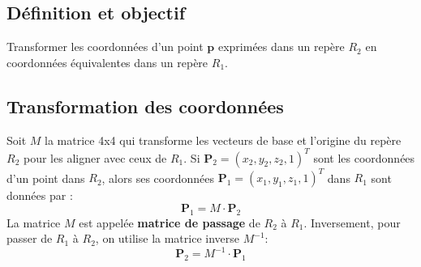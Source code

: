 \subsection{Définition et objectif}
Transformer les coordonnées d'un point \( \mathbf{p} \) exprimées dans un repère \( R_2 \) en coordonnées équivalentes dans un repère \( R_1 \).
\subsection{Transformation des coordonnées}
Soit \( M \) la matrice 4x4 qui transforme les vecteurs de base et l'origine du repère \( R_2 \) pour les aligner avec ceux de \( R_1 \). Si \( \mathbf{P}_2 = (x_2, y_2, z_2, 1)^T \) sont les coordonnées d'un point dans \( R_2 \), alors ses coordonnées \( \mathbf{P}_1 = (x_1, y_1, z_1, 1)^T \) dans \( R_1 \) sont données par :
\[ \mathbf{P}_1 = M \cdot \mathbf{P}_2 \]
La matrice \( M \) est appelée \textbf{matrice de passage} de \( R_2 \) à \( R_1 \).
Inversement, pour passer de \( R_1 \) à \( R_2 \), on utilise la matrice inverse \( M^{-1} \):
\[ \mathbf{P}_2 = M^{-1} \cdot \mathbf{P}_1 \]
